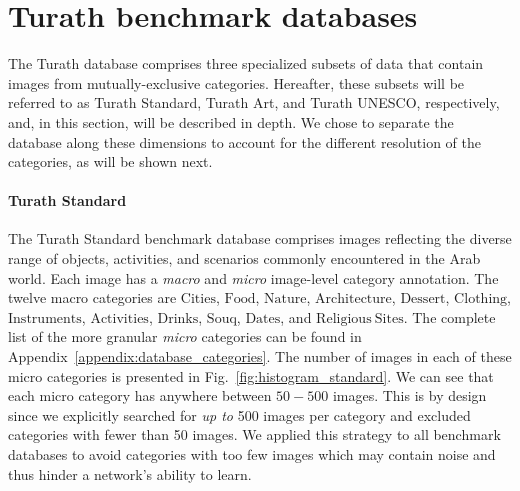 \documentclass{article}
\begin{document}


\section{Turath benchmark databases}
\label{section:benchmarks}

The Turath database comprises three specialized subsets of data that contain images from mutually-exclusive categories. Hereafter, these subsets will be referred to as Turath Standard, Turath Art, and Turath UNESCO, respectively, and, in this section, will be described in depth. We chose to separate the database along these dimensions to account for the different resolution of the categories, as will be shown next. 


\paragraph{Turath Standard}

The Turath Standard benchmark database comprises images reflecting the diverse range of objects, activities, and scenarios commonly encountered in the Arab world. Each image has a \textit{macro} and \textit{micro} image-level category annotation. The twelve macro categories are $\mathrm{Cities}$, $\mathrm{Food}$, $\mathrm{Nature}$, $\mathrm{Architecture}$, $\mathrm{Dessert}$, $\mathrm{Clothing}$, $\mathrm{Instruments}$, $\mathrm{Activities}$, $\mathrm{Drinks}$, $\mathrm{Souq}$, $\mathrm{Dates}$, and $\mathrm{Religious \ Sites}$. The complete list of the more granular \textit{micro} categories can be found in Appendix~\ref{appendix:database_categories}. The number of images in each of these micro categories is presented in Fig.~\ref{fig:histogram_standard}. We can see that each micro category has anywhere between $50-500$ images. This is by design since we explicitly searched for \textit{up to} 500 images per category and excluded categories with fewer than 50 images. We applied this strategy to all benchmark databases to avoid categories with too few images which may contain noise and thus hinder a network's ability to learn.
\end{document}
